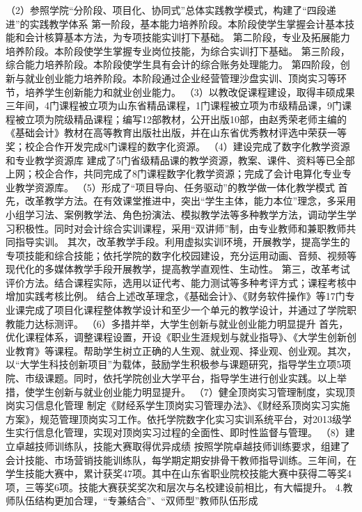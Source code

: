（2）参照学院“分阶段、项目化、协同式”总体实践教学模式，构建了“四段递进”的实践教学体系
第一阶段，基本能力培养阶段。本阶段使学生掌握会计基本技能和会计核算基本方法，为专项技能实训打下基础。
第二阶段，专业及拓展能力培养阶段。本阶段使学生掌握专业岗位技能，为综合实训打下基础。
第三阶段，综合能力培养阶段。本阶段使学生具有会计的综合账务处理能力。
第四阶段，创新与就业创业能力培养阶段。本阶段通过企业经营管理沙盘实训、顶岗实习等环节，培养学生创新能力和就业创业能力。
（3）以教改促课程建设，取得丰硕成果
三年间，4门课程被立项为山东省精品课程，1门课程被立项为市级精品课，9门课程被立项为院级精品课程；编写12部教材，公开出版10部，由赵秀荣老师主编的《基础会计》教材在高等教育出版社出版，并在山东省优秀教材评选中荣获一等奖；校企合作开发完成8门课程的数字化资源。
（4）建设完成了数字化教学资源和专业教学资源库
建成了5门省级精品课的教学资源，教案、课件、资料等已全部上网；校企合作，共同完成了8门课程数字化教学资源；完成了会计电算化专业专业教学资源库。
（5）形成了“项目导向、任务驱动”的教学做一体化教学模式
首先，改革教学方法。在有效课堂推进中，突出“学生主体，能力本位”理念，多采用小组学习法、案例教学法、角色扮演法、模拟教学法等多种教学方法，调动学生学习积极性。同时对会计综合实训课程，采用“双讲师”制，由专业教师和兼职教师共同指导实训。
其次，改革教学手段。利用虚拟实训环境，开展教学，提高学生的专项技能和综合技能；依托学院的数字化校园建设，充分运用动画、音频、视频等现代化的多媒体教学手段开展教学，提高教学直观性、生动性。
第三，改革考试评价方法。结合课程实际，选用以证代考、能力测试等多种考评方式；课程考核中增加实践考核比例。
结合上述改革理念，《基础会计》、《财务软件操作》等17门专业课完成了项目化课程整体教学设计和至少一个单元的教学设计，并通过了学院职教能力达标测评。
（6）多措并举，大学生创新与就业创业能力明显提升
首先，优化课程体系，调整课程设置，开设《职业生涯规划与就业指导》、《大学生创新创业教育》等课程。帮助学生树立正确的人生观、就业观、择业观、创业观。其次，以“大学生科技创新项目”为载体，鼓励学生积极参与课题研究，指导学生立项5项院、市级课题。同时，依托学院创业大学平台，指导学生进行创业实践。以上举措，使学生创新与就业创业能力明显提升。
（7）健全顶岗实习管理制度，实现顶岗实习信息化管理
制定《财经系学生顶岗实习管理办法》、《财经系顶岗实习实施方案》，规范管理顶岗实习工作。依托学院数字化实习实训系统平台，对2013级学生实行信息化管理，实现对顶岗实习过程的全面性、即时性监督与管理。
（8）建立卓越技师训练队，技能大赛取得优异成绩
按照学院卓越技师训练要求，组建了会计技能、市场营销技能训练队，每学期定期安排骨干教师指导训练。三年间，在学生技能大赛中，累计获奖47项。其中在山东省职业院校技能大赛中获得二等奖4项，三等奖6项。技能大赛获奖奖次和层次与名校建设前相比，有大幅提升。
4.教师队伍结构更加合理，“专兼结合”、“双师型”教师队伍形成
